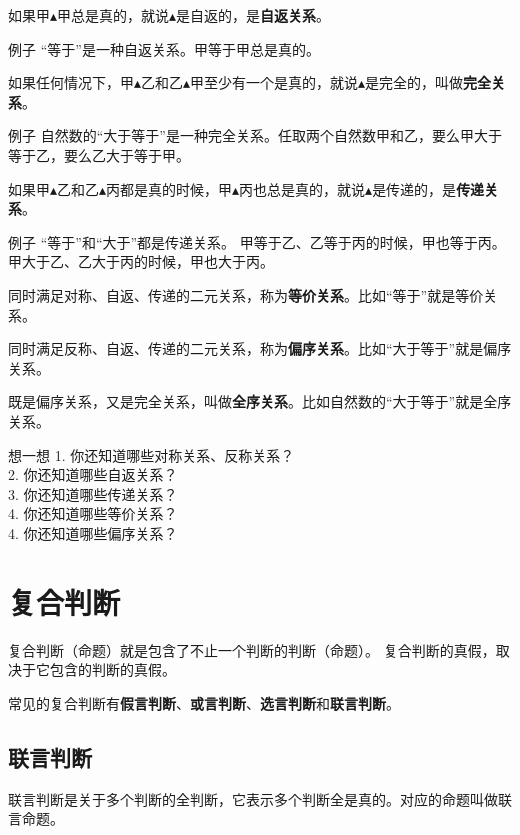 \documentclass[12pt,UTF8,a4paper]{article}
\begin{document}
如果甲$\blacktriangle$甲总是真的，就说$\blacktriangle$是自返的，是\textbf{自返关系}。

\begin{blockin}{例子}
    “等于”是一种自返关系。甲等于甲总是真的。
\end{blockin}

如果任何情况下，甲$\blacktriangle$乙和乙$\blacktriangle$甲至少有一个是真的，就说$\blacktriangle$是完全的，叫做\textbf{完全关系}。

\begin{blockin}{例子}
    自然数的“大于等于”是一种完全关系。任取两个自然数甲和乙，要么甲大于等于乙，要么乙大于等于甲。
\end{blockin}

如果甲$\blacktriangle$乙和乙$\blacktriangle$丙都是真的时候，甲$\blacktriangle$丙也总是真的，就说$\blacktriangle$是传递的，是\textbf{传递关系}。

\begin{blockin}{例子}
    “等于”和“大于”都是传递关系。
    甲等于乙、乙等于丙的时候，甲也等于丙。
    甲大于乙、乙大于丙的时候，甲也大于丙。
\end{blockin}

同时满足对称、自返、传递的二元关系，称为\textbf{等价关系}。比如“等于”就是等价关系。

同时满足反称、自返、传递的二元关系，称为\textbf{偏序关系}。比如“大于等于”就是偏序关系。

既是偏序关系，又是完全关系，叫做\textbf{全序关系}。比如自然数的“大于等于”就是全序关系。

\begin{blockaft}{想一想}
    1. 你还知道哪些对称关系、反称关系？\\
    2. 你还知道哪些自返关系？ \\
    3. 你还知道哪些传递关系？\\
    4. 你还知道哪些等价关系？\\
    4. 你还知道哪些偏序关系？
\end{blockaft}

\section{复合判断}

复合判断（命题）就是包含了不止一个判断的判断（命题）。
复合判断的真假，取决于它包含的判断的真假。

常见的复合判断有\textbf{假言判断}、\textbf{或言判断}、\textbf{选言判断}和\textbf{联言判断}。


\subsection{联言判断}
联言判断是关于多个判断的全判断，它表示多个判断全是真的。对应的命题叫做联言命题。
\end{document}
